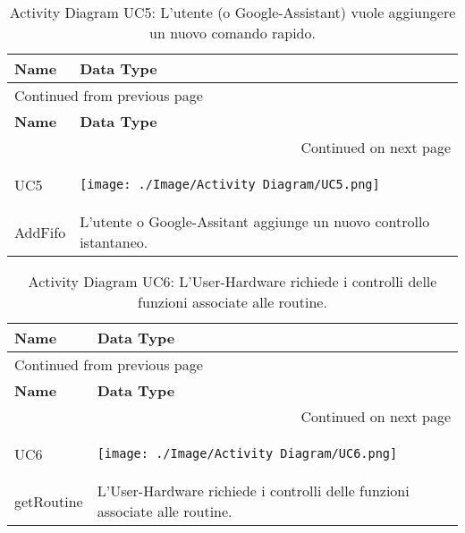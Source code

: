 \documentclass[onecolumn,a4paper]{article}
\begin{document}
\begin{longtable}{|p{2cm}|p{12cm}|}
\caption{Activity Diagram UC5:  L’utente (o Google-Assistant) vuole aggiungere un nuovo comando rapido.}
\\
\cellcolor{grey!15} \textbf{Name} & \cellcolor{grey!15} \textbf{Data Type}\\
\hline
\endfirsthead
\multicolumn{2}{l}{Continued from previous page} \\
\hline

\cellcolor{grey!15} \textbf{Name} & \cellcolor{grey!15} \textbf{Data Type} \\

\hline
\endhead
\hline\multicolumn{2}{r}{Continued on next page} \\
\endfoot
\endlastfoot
\hline
UC5 & \begin{center}
\texttt{[image: ./Image/Activity Diagram/UC5.png]}
\end{center}\\
\hline
AddFifo & L’utente o Google-Assitant aggiunge un nuovo controllo istantaneo.\\
\hline
\end{longtable}

\begin{longtable}{|p{2cm}|p{12cm}|}
\caption{Activity Diagram UC6:  L’User-Hardware richiede i controlli delle funzioni associate alle routine.}
\\
\cellcolor{grey!15} \textbf{Name} & \cellcolor{grey!15} \textbf{Data Type}\\
\hline
\endfirsthead
\multicolumn{2}{l}{Continued from previous page} \\
\hline

\cellcolor{grey!15} \textbf{Name} & \cellcolor{grey!15} \textbf{Data Type} \\

\hline
\endhead
\hline\multicolumn{2}{r}{Continued on next page} \\
\endfoot
\endlastfoot
\hline
UC6 & \begin{center}
\texttt{[image: ./Image/Activity Diagram/UC6.png]}
\end{center}\\
\hline
getRoutine & L’User-Hardware richiede i controlli delle funzioni associate alle routine.\\
\hline
\end{longtable}
\end{document}
